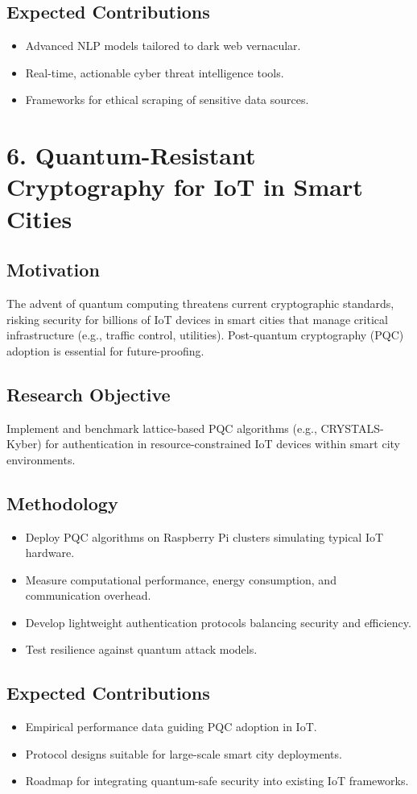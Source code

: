 \documentclass[11pt]{article}
\begin{document}
\subsection{Expected Contributions}
\label{sec:org9874987}
\begin{itemize}
\item Advanced NLP models tailored to dark web vernacular.
\item Real-time, actionable cyber threat intelligence tools.
\item Frameworks for ethical scraping of sensitive data sources.
\end{itemize}
\section{6. Quantum-Resistant Cryptography for IoT in Smart Cities}
\label{sec:orgbc8fbac}
\subsection{Motivation}
\label{sec:orga832a8b}
The advent of quantum computing threatens current cryptographic standards, risking security for billions of IoT devices in smart cities that manage critical infrastructure (e.g., traffic control, utilities). Post-quantum cryptography (PQC) adoption is essential for future-proofing.
\subsection{Research Objective}
\label{sec:org5f64391}
Implement and benchmark lattice-based PQC algorithms (e.g., CRYSTALS-Kyber) for authentication in resource-constrained IoT devices within smart city environments.
\subsection{Methodology}
\label{sec:orga27ffd2}
\begin{itemize}
\item Deploy PQC algorithms on Raspberry Pi clusters simulating typical IoT hardware.
\item Measure computational performance, energy consumption, and communication overhead.
\item Develop lightweight authentication protocols balancing security and efficiency.
\item Test resilience against quantum attack models.
\end{itemize}
\subsection{Expected Contributions}
\label{sec:org494a891}
\begin{itemize}
\item Empirical performance data guiding PQC adoption in IoT.
\item Protocol designs suitable for large-scale smart city deployments.
\item Roadmap for integrating quantum-safe security into existing IoT frameworks.
\end{itemize}
\end{document}
